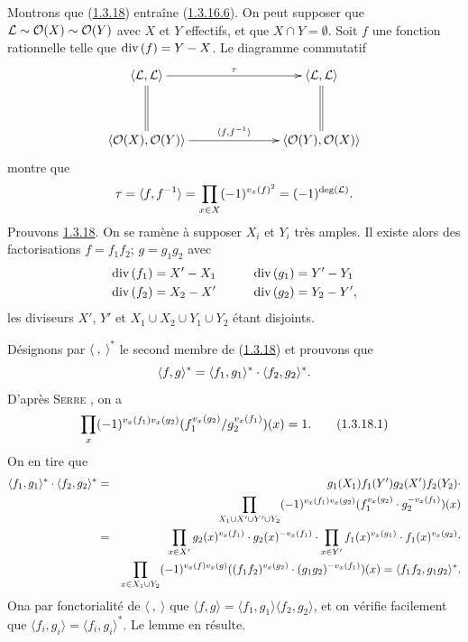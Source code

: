 \documentclass[10pt]{../fichiers-configuration-latex/smfart}
\begin{document}
Montrons que (\hyperref[XVIII.lem1.3.18]{1.3.18}) entraîne
(\hyperref[XVIII.par1.3.16.6]{1.3.16.6}). On peut supposer que 
${\mathcal L}\sim {\mathcal O}(X)\sim {\mathcal O}(Y)$ avec $X$ et $Y$ effectifs, et
que $X\cap Y=∅$. Soit $f$ une fonction rationnelle telle que
$\text{\rm div\,}(f)=Y-X$. Le diagramme commutatif
$$
\xymatrix@C=2.5cm@R=1.25cm{
\langle \Ll, \Ll\rangle  \ar[r]^{\tau} \ar@{=}[d]&
\langle \Ll,\Ll\rangle  \ar@{=}[d]\\
\langle \Oo(X), \Oo(Y)\rangle   \ar[r]^{\langle f,f^{-1}\rangle } & \langle
\Oo(Y), \Oo(X)\rangle 
}
$$
montre que
$$
\tau=\langle f,f^{-1}\rangle =\prod_{x\in
X}(-1)^{v_{x}(f)^{2}}=(-1)^{\deg({\mathcal L})}{}.
$$ Prouvons \hyperref[XVIII.lem1.3.18]{1.3.18}. On se ramène à supposer $X_{i}$ et
$Y_{i}$ très amples. Il existe alors des factorisations $f=f_{1}f_{2}$;
$g=g_{1}g_{2}$ avec
\begin{alignat*}{2}
&\text{\rm div\,}(f_{1}) = X'-X_{1} &\qquad& \text{\rm div\,}(g_{1})
= Y'-Y_{1}\\
& \text{\rm div\,}(f_{2}) = X_{2}-X' &\qquad& \text{\rm div\,}(g_{2})
= Y_{2}-Y'{},
\end{alignat*}
les diviseurs $X'$, $Y'$ et $X_{1}\cup X_{2}\cup Y_{1}\cup Y_{2}$
étant disjoints. 

Désignons par $\langle~,~\rangle^{\ast}$ le second membre de
(\hyperref[XVIII.lem1.3.18]{1.3.18}) et prouvons que 
$$ \langle f,g\rangle ^{\ast}=\langle f_{1},g_{1}\rangle ^{\ast}\cdot
\langle f_{2},g_{2}\rangle ^{\ast}{}.
$$
D'après \textsc{Serre} \cite[Ch.~III, prop.~6, p.~44]{SGA4-18:6}, on a
\begin{equation*}
\prod_{x}(-1)^{v_{x}(f_{1})v_{x}(g_{2})}
(f_{1}^{v_{x}(g_{2})}/g_{2}^{v_{x}(f_{1})}) (x)=1{}.\tag{1.3.18.1}
\end{equation*}%
On en tire que
\begin{eqnarray*}
\langle f_{1},g_{1}\rangle ^{\ast}\cdot \langle f_{2},g_{2}\rangle
^{\ast} &= &g_{1}(X_{1})f_{1}(Y')g_{2}(X')f_{2}(Y_{2})\cdot\\
& & \prod_{X_{1}\cup X'\cup Y'\cup Y_{2}}(-1)^{v_{x}(f_{1})v_{x}(g_{2})}
(f_{1}^{v_{x}(g_{2})}\cdot g_{2}^{-v_{x}(f_{1})})(x)\\
&=&\prod_{x\in X'} g_{2}(x)^{v_{x}(f_{1})}\cdot
g_{2}(x)^{-v_{x}(f_{1})}\cdot \prod_{x\in
Y'}f_{1}(x)^{v_{x}(g_{1})}\cdot f_{1}(x)^{v_{x}(g_{2})}\cdot\\
&&\prod_{x\in X_{1}\cup Y_{2}}(-1)^{v_{x}(f)v_{x}(g)}
((f_{1}f_{2})^{v_{x}(g_{2})}\cdot
(g_{1}g_{2})^{-v_{x}(f_{1})})(x)=\langle f_{1}f_{2},g_{1}g_{2}\rangle
^{\ast}{}. 
\end{eqnarray*}
On\pageoriginale a par fonctorialité de $\langle~,~\rangle $ que
$\langle f,g\rangle =\langle f_{1},g_{1}\rangle \langle
f_{2},g_{2}\rangle $, et on vérifie facilement que $\langle
f_{i},g_{i}\rangle =\langle f_{i},g_{i}\rangle ^{\ast}$. Le lemme en
résulte.
\end{document}
